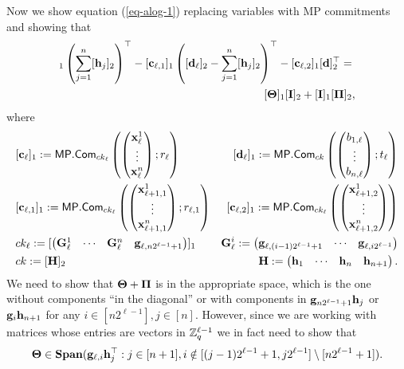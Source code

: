 Now we show equation (\ref{eq-alog-1}) replacing variables with MP commitments and showing that
\begin{align*}
[\vecb{c}_\ell]_1\left(\sum_{j=1}^n[\vecb{h}_j]_2\right)^\top-[\vecb{c}_{\ell,1}]_1\left([\vecb{d}_\ell]_2-\sum_{j=1}^n[\vecb{h}_j]_2\right)^\top-[\vecb{c}_{\ell,2}]_1[\vecb{d}]_2^\top
=&\\
[\matr{\Theta}]_1[\matr{I}]_2+[\matr{I}]_1[\matr{\Pi}]_2&,
\end{align*}
where
\begin{align*}
&[\mathbf{c}_\ell]_1:=\mathsf{MP}.\mathsf{Com}_{ck_\ell}\left(\left(\begin{matrix}\mathbf{x}^1_\ell\\\vdots\\\mathbf{x}^n_\ell\end{matrix}\right);r_\ell\right)
&[\mathbf{d}_\ell]_1:=\mathsf{MP}.\mathsf{Com}_{ck}\left(\left(\begin{matrix}b_{1,\ell}\\\vdots\\b_{n,\ell}\end{matrix}\right);t_\ell\right)\\
&[\mathbf{c}_{\ell,1}]_1:=\mathsf{MP}.\mathsf{Com}_{ck_\ell}\left(\left(\begin{matrix}\mathbf{x}^1_{\ell+1,1}\\\vdots\\\mathbf{x}^n_{\ell+1,1}\end{matrix}\right);r_{\ell,1}\right)
&[\mathbf{c}_{\ell,2}]_1:=\mathsf{MP}.\mathsf{Com}_{ck_\ell}\left(\left(\begin{matrix}\mathbf{x}^1_{\ell+1,2}\\\vdots\\\mathbf{x}^n_{\ell+1,2}\end{matrix}\right)\right)\\
&ck_\ell:=[\left(\begin{matrix}\mathbf{G}^1_{\ell}&\cdots&\mathbf{{G}}^n_{\ell} & \mathbf{g}_{\ell,n2^{\ell-1}+1}\end{matrix}\right)]_1
&\mathbf{{G}}^i_{\ell}:=\left(\begin{matrix}\mathbf{g}_{\ell,(i-1)2^{\ell-1}+1}&\cdots&\mathbf{g}_{\ell,i2^{\ell-1}}\end{matrix}\right)\\
&ck:=[\mathbf{{H}}]_2 &
\mathbf{{H}}:=\left(\begin{matrix}\mathbf{h}_1&\cdots&\mathbf{h}_n&\mathbf{h}_{n+1}\end{matrix}\right).
\end{align*}
We need to show that $\mathbf{{\Theta}}+\mathbf{{\Pi}}$ is in the appropriate space, which is the one without components ``in the diagonal'' or with components in $\mathbf{g}_{n2^{\ell-1}+1}\mathbf{h}_j$ or $\mathbf{g}_i\mathbf{h}_{n+1}$ for any $i\in[n2^{\ell-1}],j\in[n]$. However, since we are working with matrices whose entries are vectors in $\mathbb{Z}_q^{\ell-1}$ we in fact need to show that
$$
\mathbf{{\Theta}}\in\mathbf{Span}(\mathbf{g}_{\ell,i}\mathbf{h}_j^\top:j\in[n+1],i\notin[(j-1)2^{\ell-1}+1,j2^{\ell-1}]\setminus[n2^{\ell-1}+1]).
$$

